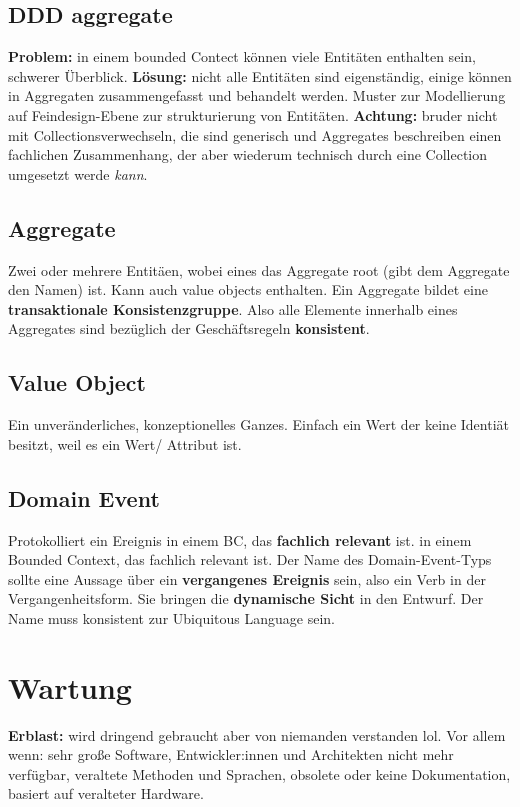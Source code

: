 \documentclass{book}
\begin{document}
    \subsection{DDD aggregate}
    \textbf{Problem: } in einem bounded Contect können viele Entitäten enthalten sein, schwerer Überblick.
    \newline
    \textbf{Lösung: } nicht alle Entitäten sind eigenständig, einige können in Aggregaten zusammengefasst und behandelt werden.
    \newline
    Muster zur Modellierung auf Feindesign-Ebene zur strukturierung von Entitäten.
    \textbf{Achtung: } bruder nicht mit Collectionsverwechseln, die sind generisch und Aggregates beschreiben einen fachlichen Zusammenhang, der aber wiederum technisch durch eine Collection umgesetzt werde \textit{kann}.

    \subsection{Aggregate}
    Zwei oder mehrere Entitäen, wobei eines das Aggregate root (gibt dem Aggregate den Namen) ist. Kann auch value objects enthalten. Ein Aggregate bildet eine \textbf{transaktionale Konsistenzgruppe}. Also alle Elemente innerhalb eines Aggregates sind bezüglich der Geschäftsregeln \textbf{konsistent}.

    \subsection{Value Object}
    Ein unveränderliches, konzeptionelles Ganzes. Einfach ein Wert der keine Identiät besitzt, weil es ein Wert/ Attribut ist.

    \subsection{Domain Event}
    Protokolliert ein Ereignis in einem BC, das \textbf{fachlich relevant} ist.  in einem
    Bounded Context, das fachlich relevant ist. Der Name des
    Domain-Event-Typs sollte eine Aussage über ein
    \textbf{vergangenes Ereignis} sein, also ein Verb in der
    Vergangenheitsform.
    Sie bringen die \textbf{dynamische Sicht} in den Entwurf.
    Der Name muss konsistent zur Ubiquitous Language sein.
    \section{Wartung}
    \textbf{Erblast:} wird dringend gebraucht aber von niemanden verstanden lol. Vor allem wenn: sehr große Software, Entwickler:innen und Architekten nicht mehr verfügbar, veraltete Methoden und Sprachen, obsolete oder keine Dokumentation, basiert auf veralteter Hardware.
\end{document}
